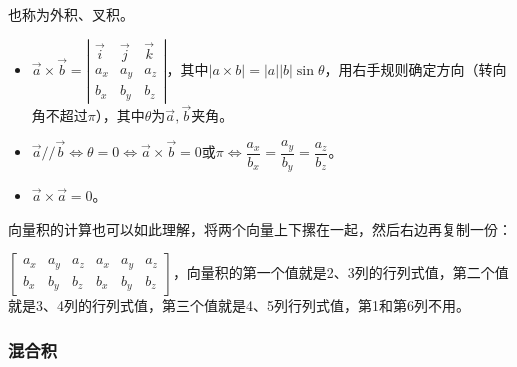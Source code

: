 \documentclass[UTF8, 12pt]{ctexart}
\begin{document}
        也称为外积、叉积。

        \begin{itemize}
            \item $\vec{a}\times\vec{b}=\left\vert\begin{array}{ccc}
                                                      \vec{i} & \vec{j} & \vec{k} \\
                                                      a_x & a_y & a_z \\
                                                      b_x & b_y & b_z
            \end{array}\right\vert$，其中$\vert a\times b\vert=\vert a\vert\vert b\vert\sin\theta$，用右手规则确定方向（转向角不超过$\pi$），其中$\theta$为$\vec{a},\vec{b}$夹角。
            \item $\vec{a}//\vec{b}\Leftrightarrow\theta=0\Leftrightarrow\vec{a}\times\vec{b}=0$或$\pi\Leftrightarrow\dfrac{a_x}{b_x}=\dfrac{a_y}{b_y}=\dfrac{a_z}{b_z}$。
            \item $\vec{a}\times\vec{a}=0$。
        \end{itemize}

        向量积的计算也可以如此理解，将两个向量上下摞在一起，然后右边再复制一份：

        $\left[\begin{array}{cccccc}
                   a_x & a_y & a_z & a_x & a_y & a_z \\
                   b_x & b_y & b_z & b_x & b_y & b_z
        \end{array}\right]$，向量积的第一个值就是2、3列的行列式值，第二个值就是3、4列的行列式值，第三个值就是4、5列行列式值，第1和第6列不用。

        \subsubsection{混合积}
\end{document}

